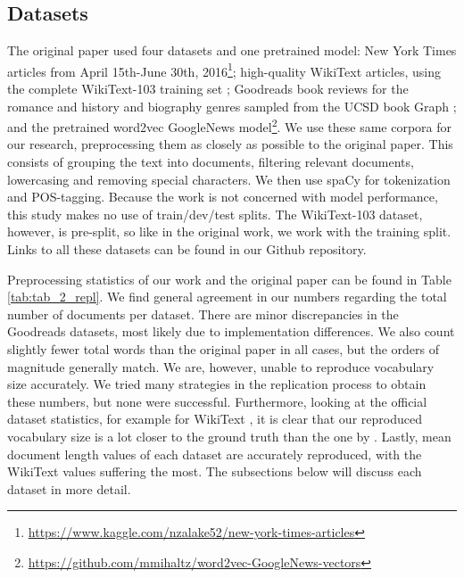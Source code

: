 \subsection{Datasets}

The original paper used four datasets and one pretrained model: New York Times articles from April
15th-June 30th,
2016\footnote{\href{https://www.kaggle.com/nzalake52/new-york-times-articles}{https://www.kaggle.com/nzalake52/new-york-times-articles}};
high-quality WikiText articles, using the complete WikiText-103 training set
\citep{DBLP:journals/corr/MerityXBS16}; Goodreads book reviews for the romance and history and
biography genres sampled from the UCSD book Graph \citep{10.1145/3240323.3240369,
	wan-etal-2019-fine}; and the pretrained word2vec GoogleNews
model\footnote{\label{footnote:googlenews}\href{https://github.com/mmihaltz/word2vec-GoogleNews-vectors}{https://github.com/mmihaltz/word2vec-GoogleNews-vectors}}.
We use these same corpora for our research, preprocessing them as closely as possible to the
original paper. This consists of grouping the text into documents, filtering relevant documents,
lowercasing and removing special characters. We then use spaCy
\citep{honnibalSpaCyIndustrialstrengthNatural2020} for tokenization and POS-tagging. Because the
work is not concerned with model performance, this study makes no use of train/dev/test splits. The
WikiText-103 dataset, however, is pre-split, so like in the original work, we work with the training
split. Links to all these datasets can be found in our Github repository.

Preprocessing statistics of our work and the original paper can be found in Table
\ref{tab:tab_2_repl}. We find general agreement in our numbers regarding the total number of
documents per dataset. There are minor discrepancies in the Goodreads datasets, most likely due to
implementation differences. We also count slightly fewer total words than the original paper in all
cases, but the orders of magnitude generally match. We are, however, unable to reproduce vocabulary
size accurately. We tried many strategies in the replication process to obtain these numbers, but
none were successful. Furthermore, looking at the official dataset statistics, for example for
WikiText \citep{DBLP:journals/corr/MerityXBS16}, it is clear that our reproduced vocabulary size is
a lot closer to the ground truth than the one by \citet{antoniak-mimno-2021-bad}. Lastly, mean
document length values of each dataset are accurately reproduced, with the WikiText values suffering
the most. The subsections below will discuss each dataset in more detail.

